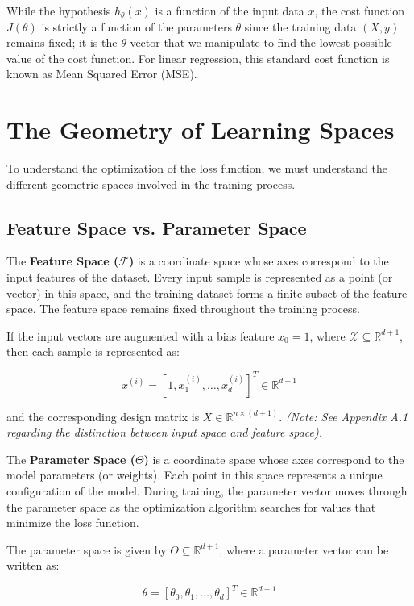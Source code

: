 \documentclass[12pt, a4paper]{report}
\begin{document}
While the hypothesis $h_\theta(x)$ is a function of the input data $x$, the cost function $J(\theta)$ is strictly a function of the parameters $\theta$ since the training data $(X, y)$ remains fixed; it is the $\theta$ vector that we manipulate to find the lowest possible value of the cost function. For linear regression, this standard cost function is known as Mean Squared Error (MSE).

\section{The Geometry of Learning Spaces}

To understand the optimization of the loss function, we must understand the different geometric spaces involved in the training process.

\subsection{Feature Space vs. Parameter Space}

The \textbf{Feature Space ($\mathcal{F}$)} is a coordinate space whose axes correspond to the input features of the dataset. Every input sample is represented as a point (or vector) in this space, and the training dataset forms a finite subset of the feature space. The feature space remains fixed throughout the training process.

If the input vectors are augmented with a bias feature $x_0=1$, where $\mathcal{X} \subseteq \mathbb{R}^{d+1}$, then each sample is represented as:

\[ x^{(i)} = [1, x_1^{(i)}, \dots, x_d^{(i)}]^T \in \mathbb{R}^{d+1} \]

and the corresponding design matrix is $X \in \mathbb{R}^{n \times (d+1)}$. \textit{(Note: See Appendix A.1 regarding the distinction between input space and feature space).}

The \textbf{Parameter Space ($\Theta$)} is a coordinate space whose axes correspond to the model parameters (or weights). Each point in this space represents a unique configuration of the model. During training, the parameter vector moves through the parameter space as the optimization algorithm searches for values that minimize the loss function.

The parameter space is given by $\Theta \subseteq \mathbb{R}^{d+1}$, where a parameter vector can be written as:

\[ \theta = [\theta_0, \theta_1, \dots, \theta_d]^T \in \mathbb{R}^{d+1} \]
\end{document}
